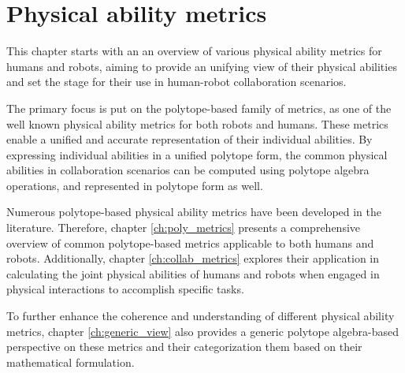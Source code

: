 \chapter{Physical ability metrics} %

\label{ch:phisical_ability_metrics} %


This chapter starts with an an overview of various physical ability metrics for humans and robots, aiming to provide an unifying view of their physical abilities and set the stage for their use in human-robot collaboration scenarios.

The primary focus is put on the polytope-based family of metrics, as one of the well known physical ability metrics for both robots and humans. These metrics enable a unified and accurate representation of their individual abilities. By expressing individual abilities in a unified polytope form, the common physical abilities in collaboration scenarios can be computed using polytope algebra operations, and represented in polytope form as well.

Numerous polytope-based physical ability metrics have been developed in the literature. Therefore, chapter \ref{ch:poly_metrics} presents a comprehensive overview of common polytope-based metrics applicable to both humans and robots. Additionally, chapter \ref{ch:collab_metrics} explores their application in calculating the joint physical abilities of humans and robots when engaged in physical interactions to accomplish specific tasks.

To further enhance the coherence and understanding of different physical ability metrics, chapter \ref{ch:generic_view} also provides a generic polytope algebra-based perspective on these metrics and their categorization them based on their mathematical formulation.


